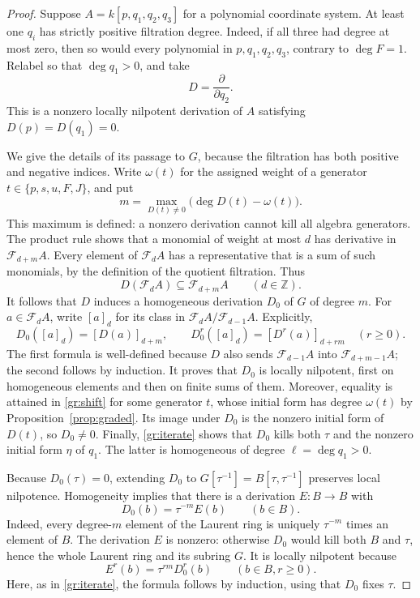 \begin{proof}
Suppose $A=k[p,q_1,q_2,q_3]$ for a polynomial coordinate system.
At least one $q_i$ has strictly positive filtration degree.
Indeed, if all three had degree at most zero, then so would every
polynomial in $p,q_1,q_2,q_3$, contrary to $\deg F=1$.
Relabel so that $\deg q_1>0$, and take
\[
 D=\frac{\partial}{\partial q_2}.
\]
This is a nonzero locally nilpotent derivation of $A$ satisfying
$D(p)=D(q_1)=0$.

We give the details of its passage to $G$, because the filtration
has both positive and negative indices.
Write $\omega(t)$ for the assigned weight of a generator
$t\in\{p,s,u,F,J\}$, and put
\begin{equation}
\label{gr:shift}
 m=\max_{D(t)\ne0}\bigl(\deg D(t)-\omega(t)\bigr).
\end{equation}
This maximum is defined: a nonzero derivation cannot kill all
algebra generators.  The product rule shows that a monomial of
weight at most $d$ has derivative in $\mathcal F_{d+m}A$.
Every element of $\mathcal F_dA$ has a representative that is a sum
of such monomials, by the definition of the quotient filtration.
Thus
\[
 D(\mathcal F_dA)\subseteq\mathcal F_{d+m}A
 \qquad(d\in\mathbb Z).
\]
It follows that $D$ induces a homogeneous derivation $D_0$ of $G$
of degree $m$.
For $a\in\mathcal F_dA$, write $[a]_d$ for its class in
$\mathcal F_dA/\mathcal F_{d-1}A$.  Explicitly,
\begin{equation}
\label{gr:iterate}
 D_0([a]_d)=[D(a)]_{d+m},\qquad
 D_0^r([a]_d)=[D^r(a)]_{d+rm}\quad(r\ge0).
\end{equation}
The first formula is well-defined because $D$ also sends
$\mathcal F_{d-1}A$ into $\mathcal F_{d+m-1}A$; the second follows
by induction.  It proves that $D_0$ is locally nilpotent, first on
homogeneous elements and then on finite sums of them.
Moreover, equality is attained in \eqref{gr:shift} for some
generator $t$, whose initial form has degree $\omega(t)$ by
Proposition~\ref{prop:graded}.  Its image under $D_0$ is the nonzero
initial form of $D(t)$, so $D_0\ne0$.
Finally, \eqref{gr:iterate} shows that $D_0$ kills both $\tau$ and
the nonzero initial form $\eta$ of $q_1$.  The latter is homogeneous
of degree $\ell=\deg q_1>0$.

Because $D_0(\tau)=0$, extending $D_0$ to
$G[\tau^{-1}]=B[\tau,\tau^{-1}]$ preserves local nilpotence.
Homogeneity implies that there is a derivation $E:B\to B$ with
\begin{equation}
\label{gr:descent}
 D_0(b)=\tau^{-m}E(b)\qquad(b\in B).
\end{equation}
Indeed, every degree-$m$ element of the Laurent ring is uniquely
$\tau^{-m}$ times an element of $B$.
The derivation $E$ is nonzero: otherwise $D_0$ would kill both $B$
and $\tau$, hence the whole Laurent ring and its subring $G$.
It is locally nilpotent because
\[
 E^r(b)=\tau^{rm}D_0^r(b)
 \qquad(b\in B, r\ge0).
\]
Here, as in \eqref{gr:iterate}, the formula follows by induction,
using that $D_0$ fixes $\tau$.


\end{proof}
